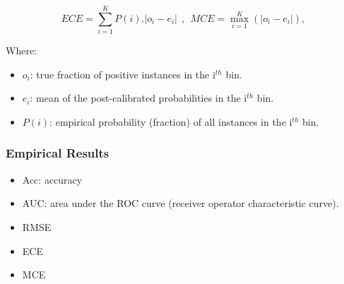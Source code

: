 \documentclass[11pt]{article}
\begin{document}
      $$
      ECE = \sum_{i=1}^{K}P(i).|o_i - e_i| ~~,~~ MCE= \max\limits_{i=1}^{K}(|o_i-e_i|),
      $$

      Where:
      \begin{itemize}
            \item $o_i$: true fraction of positive instances in the i$^{th}$ bin.
            \item $e_i$: mean of the post-calibrated probabilities in the i$^{th}$ bin.
            \item $P(i)$: empirical probability (fraction) of all instances in the i$^{th}$ bin.

      \end{itemize}
      \subsubsection{Empirical Results}
      \begin{itemize}
            \item Acc: accuracy
            \item AUC: area under the ROC curve (receiver operator characteristic curve).
            \item RMSE
            \item ECE
            \item MCE
      \end{itemize}
\end{document}
